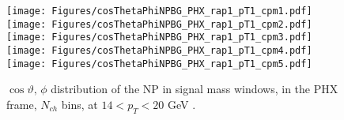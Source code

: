 \documentclass[12pt]{article}
\newcommand{\pt}{$p_{\mathrm{T}}$}
\begin{document}
%
%


\begin{figure}[htbp]
\centering
\texttt{[image: Figures/cosThetaPhiNPBG\_PHX\_rap1\_pT1\_cpm1.pdf]}
\texttt{[image: Figures/cosThetaPhiNPBG\_PHX\_rap1\_pT1\_cpm2.pdf]}
\texttt{[image: Figures/cosThetaPhiNPBG\_PHX\_rap1\_pT1\_cpm3.pdf]}
\texttt{[image: Figures/cosThetaPhiNPBG\_PHX\_rap1\_pT1\_cpm4.pdf]}
\texttt{[image: Figures/cosThetaPhiNPBG\_PHX\_rap1\_pT1\_cpm5.pdf]}
\caption{$\cos\vartheta,\,\phi$ distribution of the NP in signal mass windows, 
	in the PHX frame, $N_{ch}$ bins, at $14 < p_{T} < 20$ GeV .}
\end{figure}
\clearpage
\end{document}
